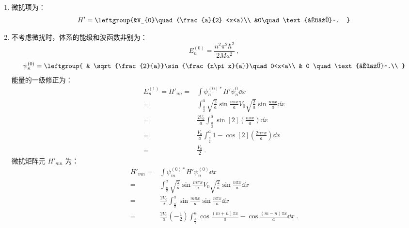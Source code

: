 \subsection{ }
\begin{enumerate}
\item 微扰项为：
\begin{equation}
H'=\leftgroup{&V_{0}\quad (\frac{a}{2} <x<a)\\
&0\quad \text{其他}~.
}
\end{equation}
\item 不考虑微扰时，体系的能级和波函数非别为：
\begin{equation}
E^{(0)}_{n}=\frac{n^2 \pi^2 \hbar^2}{2Ma^2}~,
\end{equation}
\begin{equation}
\psi^{(0)}_{n}=\leftgroup{
    & \sqrt{\frac{2}{a}}\sin{\frac{n\pi x}{a}}\quad 0<x<a\\
    & 0 \quad \text{其他}~.\\
}
\end{equation}
能量的一级修正为：
\begin{equation}
\begin{aligned}
E^{(1)}_{n}=H'_{nn}=&\int \psi^{(0)*}_{n}H'\psi^{0}_{n} \dd{x}\\
=&\int^{a}_{\frac{a}{2}} \sqrt{\frac{2}{a}}\sin{\frac{n\pi x}{a}}V_{0}\sqrt{\frac{2}{a}}\sin{\frac{n\pi x}{a}} \dd{x}\\
=&\frac{2V_{0}}{a}\int^{a}_{\frac{a}{2}} \sin[2](\frac{n\pi x}{a}) \dd{x} \\
=&\frac{V_{0}}{a}\int^{a}_{\frac{a}{2}} 1-\cos[2](\frac{2n\pi x}{a}) \dd{x} \\
=&\frac{V_{0}}{2}~.
\end{aligned}
\end{equation}
微扰矩阵元 $H'_{mn}$ 为：
\begin{equation}
\begin{aligned}
H'_{mn}=&\int \psi^{(0)*}_{m}H'\psi^{(0)}_{n} \dd{x} \\
=&\int^{a}_{\frac{a}{2}} \sqrt{\frac{2}{a}} \sin{\frac{m\pi x}{a}} V_{0} \sqrt{\frac{2}{a}} \sin{\frac{n\pi x}{a}} \dd{x} \\
=&\frac{2V_{0}}{a}\int^{a}_{\frac{a}{2}} \sin{\frac{m\pi x}{a}} \sin{\frac{n\pi x}{a}} \dd{x} \\
=&\frac{2V_{0}}{a}(-\frac{1}{2})\int^{a}_{\frac{a}{2}} \cos{\frac{(m+n)\pi x}{a}}-\cos{\frac{(m-n)\pi x}{a}} \dd{x}~.
\end{aligned}
\end{equation}
\end{enumerate}